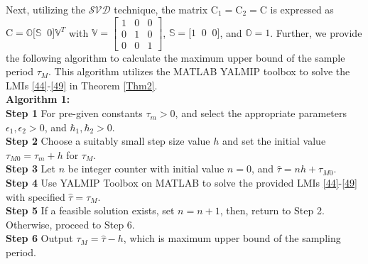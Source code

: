 \documentclass[preprint,11pt]{elsarticle}
\begin{document}
Next, utilizing the $\mathcal{SVD}$ technique, the matrix $\mathrm{C}_1=\mathrm{C}_2=\mathrm{C}$ is expressed as $\mathrm{C}=\mathbb{O}\big[ \mathbb{S}\;\;0 \big]\mathbb{V}^T$ with $\mathbb{V}=
\begin{bmatrix}
  1&   0 &   0\\
  0&   1&    0\\
  0&   0&    1
\end{bmatrix}$, $\mathbb{S}=\big[ 1\;\;0\;\;0 \big]$, and $\mathbb{O}=1$.
Further, we provide the following algorithm to calculate the maximum upper bound of the sample period $\tau_{M}$. This algorithm utilizes the MATLAB YALMIP toolbox to solve the LMIs \eqref{44}-\eqref{49} in Theorem \ref{Thm2}.\\
{\bf Algorithm 1:}\\
{\bf Step 1} For pre-given constants $\tau_m>0$, and select the appropriate parameters $\epsilon_1,\epsilon_2>0$, and $\hbar_1,\hbar_2>0$.\\
{\bf Step 2} Choose a suitably small step size value $h$ and set the initial value $\tau_{M0}=\tau_m+h$ for $\tau_{M}$.\\
{\bf Step 3} Let $n$ be integer counter with initial value $n=0$, and $\widehat{\tau}=nh+\tau_{M0}$.\\
{\bf Step 4} Use YALMIP Toolbox on MATLAB to solve the provided LMIs \eqref{44}-\eqref{49} with specified $\widehat{\tau}=\tau_{M}$. \\
{\bf Step 5} If a feasible solution exists, set $n=n+1$, then,  return to Step 2. Otherwise, proceed to Step 6.\\
{\bf Step 6} Output $\tau_{M}=\widehat{\tau}-h$, which is maximum upper bound of the sampling period.
\end{document}
